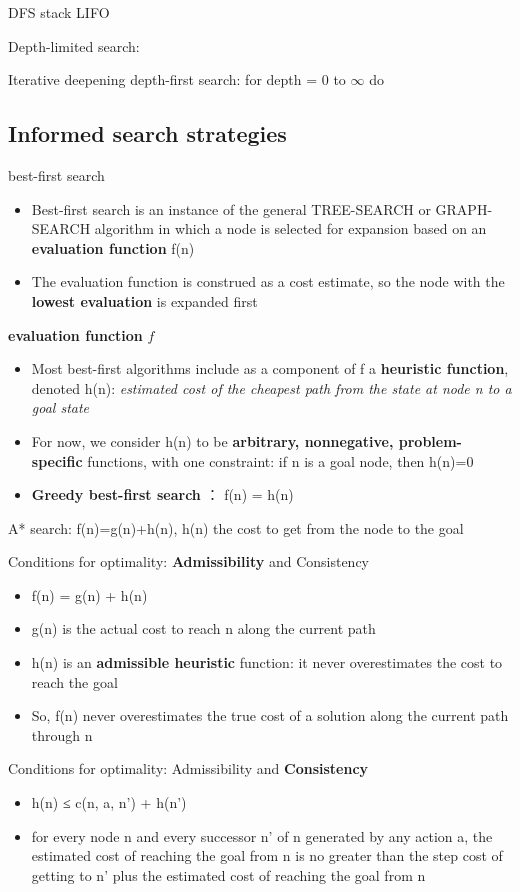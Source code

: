 \documentclass[11pt]{article}
\begin{document}
DFS stack LIFO


Depth-limited search: 


Iterative deepening depth-first search: for depth = 0 to \(\infty\) do

\subsection{Informed search strategies}
\label{sec:org18d70ca}
best-first search
\begin{itemize}
\item Best-first search is an instance of the general TREE-SEARCH or GRAPH-SEARCH
algorithm in which a node is selected for expansion based on an \textbf{evaluation
function} f(n)
\item The evaluation function is construed as a cost estimate, so the node with
the \textbf{lowest evaluation} is expanded first
\end{itemize}


\textbf{evaluation function} \(f\)
\begin{itemize}
\item Most best-first algorithms include as a component of f a \textbf{heuristic
function}, denoted h(n): \emph{estimated cost of the cheapest path from the state 
at node n to a goal state}
\item For now, we consider h(n) to be \textbf{arbitrary, nonnegative, problem-specific}
functions, with one constraint: if n is a goal node, then h(n)=0
\item \textbf{Greedy best-first search} ： f(n) = h(n)
\end{itemize}


A* search:
f(n)=g(n)+h(n), h(n) the cost to get from the node to the goal


Conditions for optimality: \textbf{Admissibility} and Consistency
\begin{itemize}
\item f(n) = g(n) + h(n)
\item g(n) is the actual cost to reach n along the current path
\item h(n) is an \textbf{admissible heuristic} function: it never overestimates the cost
to reach the goal
\item So, f(n) never overestimates the true cost of a solution along the current
path through n
\end{itemize}


Conditions for optimality: Admissibility and \textbf{Consistency}
\begin{itemize}
\item h(n) ≤ c(n, a, n') + h(n')
\item for every node n and every successor n’ of n generated by any action a,
the estimated cost of reaching the goal from n is no greater than the step
cost of getting to n’ plus the estimated cost of reaching the goal from n
\end{itemize}
\end{document}
